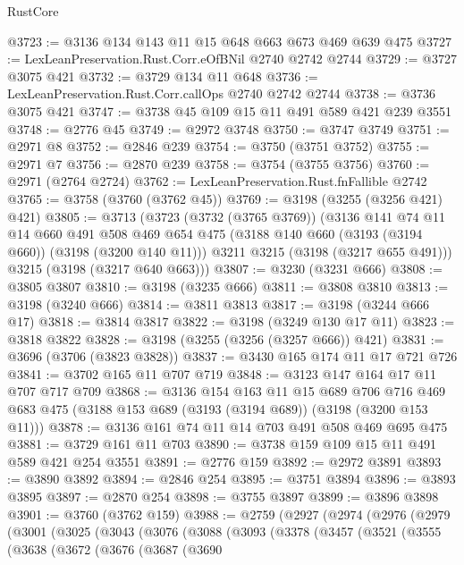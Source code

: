 \begin{lexlean}{RustCore}
\begin{coremodule}
@3723 := @3136 @134 @143 @11 @15 @648 @663 @673 @469 @639 @475
@3727 := LexLeanPreservation.Rust.Corr.eOfBNil @2740 @2742 @2744
@3729 := @3727 @3075 @421
@3732 := @3729 @134 @11 @648
@3736 := LexLeanPreservation.Rust.Corr.callOps @2740 @2742 @2744
@3738 := @3736 @3075 @421
@3747 := @3738 @45 @109 @15 @11 @491 @589 @421 @239 @3551
@3748 := @2776 @45
@3749 := @2972 @3748
@3750 := @3747 @3749
@3751 := @2971 @8
@3752 := @2846 @239
@3754 := @3750 (@3751 @3752)
@3755 := @2971 @7
@3756 := @2870 @239
@3758 := @3754 (@3755 @3756)
@3760 := @2971 (@2764 @2724)
@3762 := LexLeanPreservation.Rust.fnFallible @2742
@3765 := @3758 (@3760 (@3762 @45))
@3769 := @3198 (@3255 (@3256 @421) @421)
@3805 := @3713
    (@3723
      (@3732 (@3765 @3769))
      (@3136
        @141
        @74
        @11
        @14
        @660
        @491
        @508
        @469
        @654
        @475
        (@3188 @140 @660 (@3193 (@3194 @660)) (@3198 (@3200 @140 @11)))
        @3211
        @3215
        (@3198 (@3217 @655 @491)))
      @3215
      (@3198 (@3217 @640 @663)))
@3807 := @3230 (@3231 @666)
@3808 := @3805 @3807
@3810 := @3198 (@3235 @666)
@3811 := @3808 @3810
@3813 := @3198 (@3240 @666)
@3814 := @3811 @3813
@3817 := @3198 (@3244 @666 @17)
@3818 := @3814 @3817
@3822 := @3198 (@3249 @130 @17 @11)
@3823 := @3818 @3822
@3828 := @3198 (@3255 (@3256 (@3257 @666)) @421)
@3831 := @3696 (@3706 (@3823 @3828))
@3837 := @3430 @165 @174 @11 @17 @721 @726
@3841 := @3702 @165 @11 @707 @719
@3848 := @3123 @147 @164 @17 @11 @707 @717 @709
@3868 := @3136
    @154
    @163
    @11
    @15
    @689
    @706
    @716
    @469
    @683
    @475
    (@3188 @153 @689 (@3193 (@3194 @689)) (@3198 (@3200 @153 @11)))
@3878 := @3136 @161 @74 @11 @14 @703 @491 @508 @469 @695 @475
@3881 := @3729 @161 @11 @703
@3890 := @3738 @159 @109 @15 @11 @491 @589 @421 @254 @3551
@3891 := @2776 @159
@3892 := @2972 @3891
@3893 := @3890 @3892
@3894 := @2846 @254
@3895 := @3751 @3894
@3896 := @3893 @3895
@3897 := @2870 @254
@3898 := @3755 @3897
@3899 := @3896 @3898
@3901 := @3760 (@3762 @159)
@3988 := @2759
    (@2927
      (@2974
        (@2976
          (@2979
            (@3001
              (@3025
                (@3043
                  (@3076
                    (@3088
                      (@3093
                        (@3378
                          (@3457
                            (@3521
                              (@3555
                                (@3638
                                  (@3672
                                    (@3676
                                      (@3687
                                        (@3690

\end{coremodule}
\end{lexlean}
